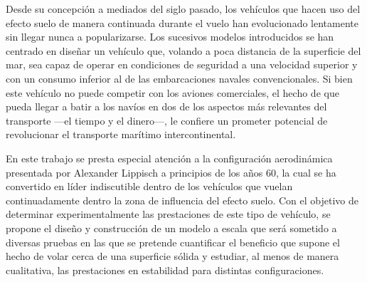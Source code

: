 Desde su concepción a mediados del siglo pasado, los vehículos que hacen uso del efecto suelo de manera continuada durante el vuelo han evolucionado lentamente sin llegar nunca a popularizarse. Los sucesivos modelos introducidos se han centrado en diseñar un vehículo que, volando a poca distancia de la superficie del mar, sea capaz de operar en condiciones de seguridad a una velocidad superior y con un consumo inferior al de las embarcaciones navales convencionales. Si bien este vehículo no puede competir con los aviones comerciales, el hecho de que pueda llegar a batir a los navíos en dos de los aspectos más relevantes del transporte —el tiempo y el dinero—, le confiere un prometer potencial de revolucionar el transporte marítimo intercontinental.

En este trabajo se presta especial atención a la configuración aerodinámica presentada por Alexander Lippisch a principios de los años 60, la cual se ha convertido en líder indiscutible dentro de los vehículos que vuelan continuadamente dentro la zona de influencia del efecto suelo. Con el objetivo de determinar experimentalmente las prestaciones de este tipo de vehículo, se propone el diseño y construcción de un modelo a escala que será sometido a diversas pruebas en las que se pretende cuantificar el beneficio que supone el hecho de volar cerca de una superficie sólida y estudiar, al menos de manera cualitativa, las prestaciones en estabilidad para distintas configuraciones.